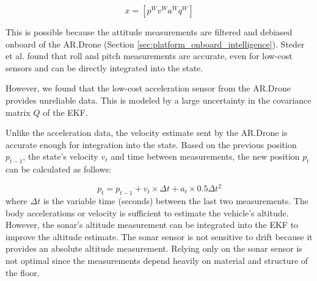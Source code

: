 \begin{equation}
x = [ p^{W}  v^{W}  a^{W}  q^{W} ]
\label{eq:EKF_state_vecor}
\end{equation}

This is possible because the attitude measurements are filtered and debiased onboard of the AR.Drone (Section \ref{sec:platform_onboard_intelligence}).
Steder et al. \cite{steder2008visual} found that roll and pitch measurements are accurate, even for low-cost sensors and can be directly integrated into the state.


However, we found that the low-cost acceleration sensor from the AR.Drone provides unreliable data.
This is modeled by a large uncertainty in the covariance matrix $Q$ of the EKF.

Unlike the acceleration data, the velocity estimate sent by the AR.Drone is accurate enough for integration into the state.
Based on the previous position $p_{t-1}$, the state's velocity $v_{t}$ and time between measurements, the new position $p_{t}$ can be calculated as follows:

\begin{equation}
p_{t} = p_{t-1} + v_{t} \times \Delta t + a_{t} \times 0.5 \Delta t^2
\end{equation}
where $\Delta t$ is the variable time (seconds) between the last two measurements.
The body accelerations or velocity is sufficient to estimate the vehicle's altitude.
However, the sonar's altitude measurement can be integrated into the EKF to improve the altitude estimate.
The sonar sensor is not sensitive to drift because it provides an absolute altitude measurement.
Relying only on the sonar sensor is not optimal since the measurements depend heavily on material and structure of the floor.



